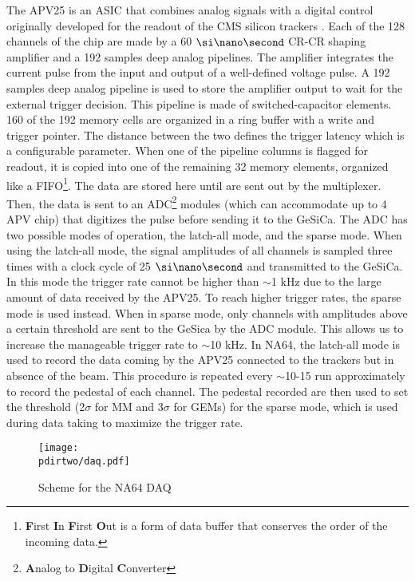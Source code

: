 The APV25 is an ASIC that combines analog signals with a digital control \cite{Bodlak_2013} originally developed for the readout of the CMS silicon trackers \cite{article,inproceedings,apv-useguide}. Each of the 128 channels of the chip are made by a 60 $\nas$ CR-CR shaping amplifier and a 192 samples deep analog pipelines. The amplifier integrates the current pulse from the input and output of a well-defined voltage pulse. A 192 samples deep analog pipeline is used to store the amplifier output to wait for the external trigger decision. This pipeline is made of switched-capacitor elements. 160 of the 192 memory cells are organized in a ring buffer with a write and trigger pointer. The distance between the two defines the trigger latency which is a configurable parameter. When one of the pipeline columns is flagged for readout, it is copied into one of the remaining 32 memory elements, organized like a FIFO\footnote{\textbf{F}irst \textbf{I}n \textbf{F}irst \textbf{O}ut is a form of data buffer that conserves the order of the incoming data.}. The data are stored here until are sent out by the multiplexer. Then, the data is sent to an ADC\footnote{\textbf{A}nalog to \textbf{D}igital \textbf{C}onverter} modules (which can accommodate up to 4 APV chip) that digitizes the pulse before sending it to the GeSiCa. The ADC has two possible modes of operation, the latch-all mode, and the sparse mode. When using the latch-all mode, the signal amplitudes of all channels is sampled three times with a clock cycle of 25 $\nas$ and transmitted to the GeSiCa. In this mode the trigger rate cannot be higher than $\sim$1 \si{\kilo\hertz} due to the large amount of data received by the APV25. To reach higher trigger rates, the sparse mode is used instead. When in sparse mode, only channels with amplitudes above a certain threshold are sent to the GeSica by the ADC module. This allows us to increase the manageable trigger rate to $\sim$10 \si{\kilo\hertz}. In NA64, the latch-all mode is used to record the data coming by the APV25 connected to the trackers but in absence of the beam. This procedure is repeated every $\sim$10-15 run approximately to record the pedestal of each channel. The pedestal recorded are then used to set the threshold (2$\sigma$ for MM and 3$\sigma$ for GEMs) for the sparse mode, which is used during data taking to maximize the trigger rate.

\begin{figure}[tbh!]
\centering
\texttt{[image: \\pdirtwo/daq.pdf]}
\caption{Scheme for the NA64 DAQ}
\label{fig:daq}
\end{figure}

